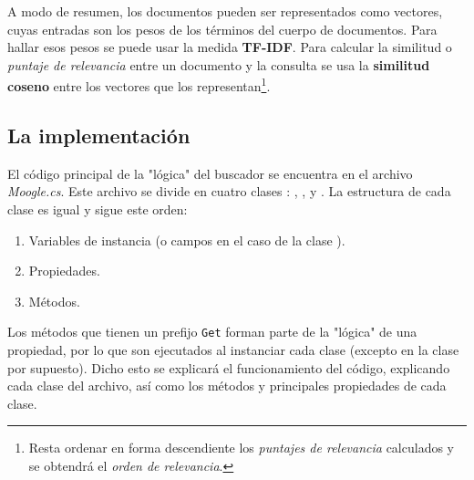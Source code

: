 \documentclass{article}
\begin{document}
A modo de resumen, los documentos pueden ser representados como vectores, cuyas entradas son los pesos de los términos del cuerpo de documentos. Para hallar esos pesos se puede usar la medida \textbf{TF-IDF}. Para calcular la similitud o \textit{puntaje de relevancia} entre un documento y la consulta se usa la \textbf{similitud coseno} entre los vectores que los representan\footnote{Resta ordenar en forma descendiente los \textit{puntajes de relevancia} calculados y se obtendrá el  \textit{orden de relevancia}.}. 
\subsection{La implementación}
El código principal de la "lógica" del buscador se encuentra en el archivo \textit{Moogle.cs}. Este archivo se divide en cuatro clases :  , ,  y . La estructura de cada clase es igual y sigue este orden:
\begin{enumerate}
\item Variables de instancia (o campos en el caso de la clase ).
\item Propiedades.
\item Métodos.
\end{enumerate}
Los métodos que tienen un prefijo \texttt{Get} forman parte de la "lógica" de una propiedad, por lo que son ejecutados al instanciar cada clase (excepto en la clase  por supuesto). Dicho esto se explicará el funcionamiento del código, explicando cada clase del archivo, así como los métodos y principales propiedades de cada clase.
\end{document}
